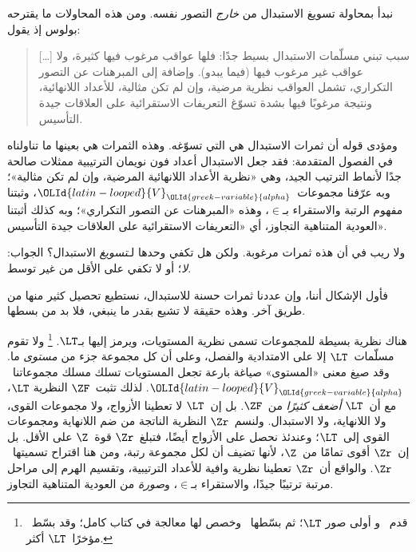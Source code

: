 \documentclass[../../../include/open-logic-section]{subfiles}
\begin{document}

نبدأ بمحاولة تسويغ الاستبدال من \emph{خارج} التصور نفسه. ومن هذه
المحاولات ما يقترحه بولوس إذ يقول:
\begin{quote}
  [\ldots] سبب تبني مسلّمات الاستبدال بسيط جدًا: فلها عواقب مرغوب
  فيها كثيرة، ولا عواقب غير مرغوب فيها (فيما يبدو). وإضافة إلى
  المبرهنات عن التصور التكراري، تشمل العواقب نظرية مرضية، وإن لم تكن
  مثالية، للأعداد اللانهائية، ونتيجة مرغوبًا فيها بشدة تسوّغ التعريفات
  الاستقرائية على العلاقات جيدة التأسيس.
  \citep[229]{Boolos1971}
\end{quote}
ومؤدى قوله أن ثمرات الاستبدال هي التي تسوّغه. وهذه الثمرات هي بعينها
ما تناولناه في الفصول المتقدمة: فقد جعل الاستبدال أعداد فون نويمان
الترتيبية ممثلات صالحة جدًا لأنماط الترتيب الجيد، وهي «نظرية الأعداد
اللانهائية المرضية، وإن لم تكن مثالية»؛ وبه عرّفنا مجموعات~$\OLId{latin-looped}{V}_\OLId{greek-variable}{alpha}$،
وثبتنا مفهوم الرتبة والاستقراء بـ$\in$، وهذه «المبرهنات عن التصور
التكراري»؛ وبه كذلك أثبتنا العودية المتناهية التجاوز، أي «التعريفات
الاستقرائية على العلاقات جيدة التأسيس».

ولا ريب في أن هذه ثمرات مرغوبة. ولكن هل تكفي وحدها
لـ\emph{تسويغ} الاستبدال؟ الجواب: \emph{لا}؛ أو لا تكفي على
الأقل من غير توسط.

فأول الإشكال أننا، وإن عددنا ثمرات حسنة للاستبدال، نستطيع تحصيل
كثير منها من طريق آخر. وهذه حقيقة لا تشيع بقدر ما ينبغي، فلا بد من
بسطها.

هناك نظرية بسيطة للمجموعات تسمى نظرية المستويات، ويرمز إليها بـ$\LT$.
\footnote{قدم~\citet{Montague1965} و\citet{Scott1974} أولى صور
  $\LT$؛ ثم بسّطها~\citet{Potter2004} وخصص لها معالجة في كتاب كامل؛
  وقد بسّط~\citet{ButtonLT1} مؤخرًا~$\LT$ أكثر.}
ولا تقوم مسلّمات~$\LT$ إلا على الامتدادية والفصل، وعلى أن كل مجموعة
جزء من \emph{مستوى} ما. وقد صيغ معنى «المستوى» صياغة بارعة تجعل
المستويات تسلك مسلك مجموعاتنا~$\OLId{latin-looped}{V}_\OLId{greek-variable}{alpha}$. لذلك تثبت~$\ZF$ النظرية
$\LT$، مع أن~$\LT$ \emph{أضعف كثيرًا} من~$\ZF$. بل إن~$\LT$ لا
تعطينا الأزواج، ولا مجموعات القوى، ولا اللانهاية، ولا الاستبدال.
ولنسم~$\Zr$ النظرية الناتجة من ضم اللانهاية ومجموعات القوى إلى~$\LT$؛
وعندئذ نحصل على الأزواج أيضًا، فتبلغ~$\Zr$ قوة~$\Z$ على الأقل. بل
إن~$\Zr$ أقوى تمامًا من~$\Z$، لأنها تضيف أن لكل مجموعة رتبة، ومن هنا
اقتراح تسميتها~$\Zr$. والواقع أن~$\Zr$ تعطينا نظرية وافية للأعداد
الترتيبية، وتقسيم الهرم إلى مراحل مرتبة ترتيبًا جيدًا، والاستقراء
بـ$\in$، و\emph{صورة} من العودية المتناهية التجاوز.
\end{document}

